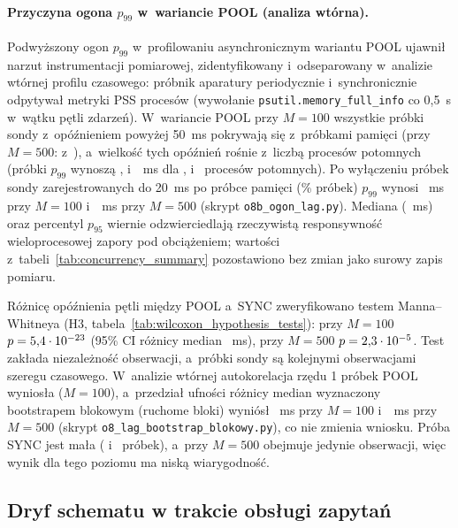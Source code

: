 \paragraph{Przyczyna ogona $p_{99}$ w~wariancie POOL (analiza wtórna).} Podwyższony ogon $p_{99}$ w~profilowaniu asynchronicznym wariantu POOL ujawnił narzut instrumentacji pomiarowej, zidentyfikowany i~odseparowany w~analizie wtórnej profilu czasowego: próbnik aparatury periodycznie i~synchronicznie odpytywał metryki PSS procesów (wywołanie \texttt{psutil.memory\_full\_info} co 0,5~s w~wątku pętli zdarzeń). W~wariancie POOL przy $M = 100$ wszystkie \wynObSpikesHundred{} próbki sondy z~opóźnieniem powyżej 50~ms pokrywają się z~próbkami pamięci (przy $M = 500$: \wynObSpikesNearFivehundred{} z~\wynObSpikesFivehundred), a~wielkość tych opóźnień rośnie z~liczbą procesów potomnych (próbki $p_{99}$ wynoszą \wynObPnnAllTwoHundred{}, \wynObPnnAllHundred{} i~\wynObPnnAllEightHundred~ms dla \wynObChildrenTwoHundred, \wynObChildrenHundred{} i~\wynObChildrenEightHundred{} procesów potomnych). Po wyłączeniu próbek sondy zarejestrowanych do 20~ms po próbce pamięci (\wynObExclPctHundred\% próbek) $p_{99}$ wynosi \wynObPnnExclHundred~ms przy $M = 100$ i~\wynObPnnExclFivehundred~ms przy $M = 500$ (skrypt \texttt{o8b\_ogon\_lag.py}). Mediana (\wynCcPoolHundredLagMed~ms) oraz percentyl $p_{95}$ wiernie odzwierciedlają rzeczywistą responsywność wieloprocesowej zapory pod obciążeniem; wartości z~tabeli~\ref{tab:concurrency_summary} pozostawiono bez zmian jako surowy zapis pomiaru.

Różnicę opóźnienia pętli między POOL a~SYNC zweryfikowano testem Manna--Whitneya (H3, tabela~\ref{tab:wilcoxon_hypothesis_tests}): przy $M = 100$ $p = 5{,}4 \cdot 10^{-23}$ (95\% CI różnicy median \wynHtrzyHundredCi~ms), przy $M = 500$ $p = 2{,}3 \cdot 10^{-5}$. Test zakłada niezależność obserwacji, a~próbki sondy są kolejnymi obserwacjami szeregu czasowego. W~analizie wtórnej autokorelacja rzędu 1 próbek POOL wyniosła \wynOeightAcfPoolHundred{} ($M = 100$), a~przedział ufności różnicy median wyznaczony bootstrapem blokowym (ruchome bloki) wyniósł \wynOeightCiHundred~ms przy $M = 100$ i~\wynOeightCiFivehundred~ms przy $M = 500$ (skrypt \texttt{o8\_lag\_bootstrap\_blokowy.py}), co nie zmienia wniosku. Próba SYNC jest mała (\wynCcSyncHundredLagN{} i~\wynCcSyncFivehundredLagN{} próbek), a~przy $M = 500$ obejmuje jedynie \wynCcSyncFivehundredLagN{} obserwacji, więc wynik dla tego poziomu ma niską wiarygodność.

\subsection{Dryf schematu w trakcie obsługi zapytań}
\label{subsec:wyniki_drift}

